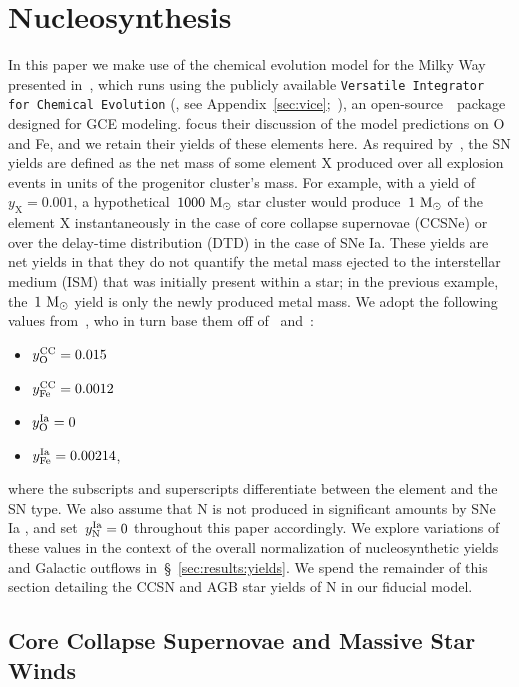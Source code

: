 \documentclass[ms.tex]{subfiles}
\begin{document}
\section{Nucleosynthesis}
\label{sec:yields}

In this paper we make use of the chemical evolution model for the Milky Way
presented in~\citet{Johnson2021}, which runs using the publicly available
\texttt{Versatile Integrator for Chemical Evolution}
(\vice, see Appendix~\ref{sec:vice};~\citealp{Johnson2020, Griffith2021a,
Johnson2021}), an open-source~\python~package designed for GCE modeling.
\citet{Johnson2021} focus their discussion of the model predictions on O and
Fe, and we retain their yields of these elements here.
As required by~\vice, the SN yields are defined as the net mass of some element
X produced over all explosion events in units of the progenitor cluster's
mass.
For example, with a yield of~$y_\text{X} = 0.001$, a hypothetical~$1000~\text{M}_\odot$
star cluster would produce~$1~\text{M}_\odot$ of the element X instantaneously in the
case of core collapse supernovae (CCSNe) or over the delay-time distribution
(DTD) in the case of SNe Ia.
These yields are net yields in that they do not quantify the metal mass
ejected to the interstellar medium (ISM) that was initially present within a
star; in the previous example, the~$1~\text{M}_\odot$ yield is only the newly produced
metal mass.
We adopt the following values from~\citet{Johnson2021}, who in turn base them
off of~\citet*{Weinberg2017} and~\citet{Johnson2020}:
\begin{itemize}
	\item $y_\text{O}^\text{CC} = 0.015$

	\item $y_\text{Fe}^\text{CC} = 0.0012$

	\item $y_\text{O}^\text{Ia} = 0$

	\item $y_\text{Fe}^\text{Ia} = 0.00214$,
\end{itemize}
where the subscripts and superscripts differentiate between the element and the
SN type.
We also assume that N is not produced in significant amounts by SNe Ia
\citep{Johnson2019}, and set~$y_\text{N}^\text{Ia} = 0$ throughout this paper
accordingly.
We explore variations of these values in the context of the overall
normalization of nucleosynthetic yields and Galactic outflows
in~\S~\ref{sec:results:yields}.
We spend the remainder of this section detailing the CCSN and AGB star yields
of N in our fiducial model.

\subsection{Core Collapse Supernovae and Massive Star Winds}
\label{sec:yields:ccsne}
\end{document}
